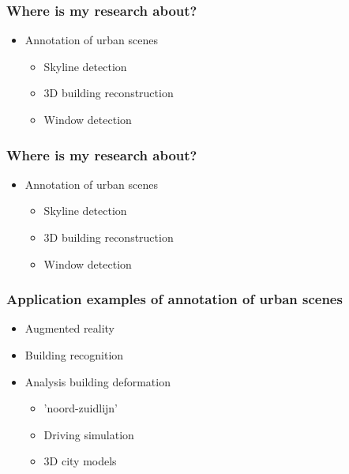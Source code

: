 \documentclass{beamer}
\begin{document}
\frame
{
}


\frame
{
	\frametitle{Where is my research about?}
	\begin{itemize}
	\item Annotation of urban scenes
		\begin{itemize}
			\item Skyline detection
			\item <+-| alert@+> 3D building reconstruction
			\item <+-| alert@+> Window detection
		\end{itemize}
	\end{itemize}
}

\frame
{
}
\frame
{
	\frametitle{Where is my research about?}
	\begin{itemize}
	\item Annotation of urban scenes
		\begin{itemize}
			\item Skyline detection
			\item 3D building reconstruction
			\item <+-| alert@+> Window detection
		\end{itemize}
	\end{itemize}
}
\frame
{
	\frametitle{Application examples of annotation of urban scenes}
	\begin{itemize}
		\item <+-| alert@+> Augmented reality
		\item <+-| alert@+> Building recognition
		\item <+-| alert@+> Analysis building deformation
		\begin{itemize}
			\item <+-| alert@+> 	'noord-zuidlijn'
		\item <+-| alert@+> Driving simulation
		\item <+-| alert@+> 3D city models
		\end{itemize}
	\end{itemize}
}

\frame
{
}

\frame
{
}

\frame
{
}
\end{document}
